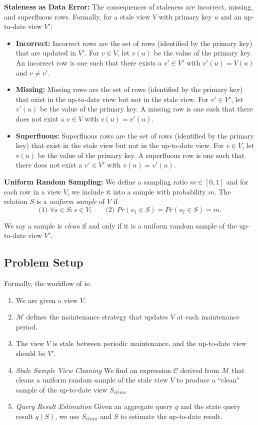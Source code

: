 \noindent \textbf{Staleness as Data Error:} The consequences of staleness are incorrect, missing, and superfluous rows. 
Formally, for a stale view $V$ with primary key $u$ and an up-to-date view $V'$:
\begin{itemize}[noitemsep] \sloppy
	\item \textbf{Incorrect: } Incorrect rows are the set of rows (identified by the primary key) that are updated in $V'$. For $v \in V$, let $v(u)$ be the value of the primary key. An incorrect row is one such that there exists a $v' \in V'$ with $v'(u) = V(u)$ and $v \ne v'$.
	\item \textbf{Missing: } Missing rows are the set of rows (identified by the primary key) that exist in the up-to-date view but not in the stale view. For $v' \in V'$, let $v'(u)$ be the value of the primary key. A missing row is one such that there does not exist a $v \in V$ with $v(u) = v'(u)$.
	\item \textbf{Superfluous: } Superfluous rows are the set of rows (identified by the primary key) that exist in the stale view but not in the up-to-date view. For $v \in V$, let $v(u)$ be the value of the primary key. A superfluous row is one such that there does not exist a $v' \in V'$ with $v(u) = v'(u)$.
\end{itemize}

\vspace{0.5em}

\noindent \textbf{Uniform Random Sampling:}
We define a sampling ratio $m\in [0,1]$ and for each row in a view $V$, we include it into a sample with probability $m$.
The relation $S$ is a \emph{uniform sample} of $V$ if
\[\text{(1) } \forall s \in S : s \in V\text{;~~~~~ (2) }Pr(s_1 \in S) =  Pr(s_2 \in S) = m.\]

\vspace{0.5em}

We say a sample is \emph{clean} if and only if it is a uniform random sample of the up-to-date view $V'$. 

\subsection{Problem Setup}
Formally, the workflow of \svc is:\vspace{-0.5em}
\begin{enumerate}[noitemsep]
\item We are given a view $V$.
\item $\mathcal{M}$ defines the maintenance strategy that updates $V$ at each maintenance period.
\item The view $V$ is stale between periodic maintenance, and the up-to-date view should be $V'$.
\item \emph{Stale Sample View Cleaning} We find an expression $\mathcal{C}$ derived from $\mathcal{M}$ 
that cleans a uniform random sample of the stale view $V$ to produce a ``clean" sample of the up-to-date
view $S_{clean}$.
\item \emph{Query Result Estimation} Given an aggregate query $q$ and the state query result $q(S)$, we use $S_{clean}$ and $S$ to estimate the up-to-date result. 
\end{enumerate} 

